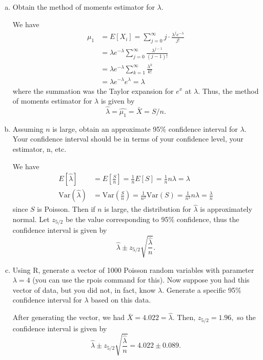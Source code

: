 \documentclass{article}
\newcommand{\var}{\mathrm{Var}}
\begin{document}
\begin{enumerate}
\begin{enumerate}[(a)]
\begin{soln}
				\end{soln}

			\item Obtain the method of moments estimator for $\lambda.$

				\begin{soln}
					We have 
					\begin{align*}
						\mu_1 &= E[X_i] = \sum_{j=0}^{\infty}j\cdot\frac{\lambda^j e^{-\lambda}}{j!} \\
						&= \lambda e^{-\lambda} \sum_{j=0}^{\infty} \frac{\lambda^{j-1}}{(j-1)!} \\
						&= \lambda e^{-\lambda} \sum_{k=1}^{\infty}\frac{\lambda^k}{k!} \\
						&= \lambda e^{-\lambda} e^{\lambda}=\lambda
					\end{align*} where the summation was the Taylor expansion for $e^x$ at $\lambda.$ Thus, the method of moments estimator for $\lambda$ is given by \[\hat{\lambda}=\hat{\mu_1}=\bar{X}=S/n.\]
					
				\end{soln}
			\item Assuming $n$ is large, obtain an approximate 95\% confidence interval for $\lambda.$ Your confidence interval should be in terms of your confidence level, your estimator, n, etc.
				\begin{soln}
					We have 
					\begin{align*}
						E[\hat{\lambda}] &= E\left[ \frac{S}{n} \right] = \frac{1}{n} E[S]= \frac{1}{n} n\lambda=\lambda \\
						\var(\hat{\lambda}) &= \var\left( \frac{S}{n} \right) = \frac{1}{n^2}\var(S)=\frac{1}{n^2}n\lambda=\frac{\lambda}{n}
					\end{align*} since $S$ is Poisson. Then if $n$ is large, the distribution for $\hat{\lambda}$ is approximately normal. Let $z_{5/2}$ be the value corresponding to 95\% confidence, thus the confidence interval is given by \[\hat{\lambda} \pm z_{5/2} \sqrt{\frac{\hat{\lambda}}{n}}.\]
				\end{soln}

			\item Using R, generate a vector of 1000 Poisson random variables with parameter $\lambda=4$ (you can use the rpois command for this). Now suppose you had this vector of data, but you did not, in fact, know $\lambda.$ Generate a specific 95\% confidence interval for $\lambda$ based on this data.
				\begin{soln}
					After generating the vector, we had $\bar{X}=4.022=\hat{\lambda}.$ Then, $z_{5/2}=1.96,$ so the confidence interval is given by \[\hat{\lambda}\pm z_{5/2}\sqrt{\frac{\hat{\lambda}}{n}} = 4.022\pm 0.089.\]
				\end{soln}


\end{enumerate}
\end{enumerate}
\end{document}
